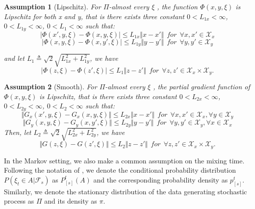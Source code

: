 \documentclass[twoside,11pt]{article}
\newtheorem{assumption}{Assumption}
\numberwithin{equation}{section}
\newcommand{\huaf}{\mathcal{F}}
\begin{document}
				
				
				
				\begin{assumption}[Lipschitz]\label{assumptionlipschitz}
					For $ \Pi $-almost every $ \xi $ , the function $ \Phi(x,y,\xi) $ is Lipschitz for both x and y, that is there exists three constant $0 < L_{1x} <\infty $,$ 0 <  L_{1y}  <\infty $, $ 0 <  L_{1}  <\infty $ such that:
					$$ |\Phi(x',y,\xi) - \Phi(x,y,\xi)| \le L_{1x } \Vert x-x' \Vert~~ for ~~\forall x,x'\in \mathcal{X}_x$$
					$$ |\Phi(x,y,\xi) - \Phi(x,y',\xi)| \le L_{1y } \Vert y-y' \Vert~~ for ~~\forall y,y'\in \mathcal{X}_y$$
					
					and let $ L_{1  } \triangleq \sqrt{2}  \sqrt{L_{1x } ^2 + L_{1y }^2}$, we have 
					$$ |\Phi(z,\xi) - \Phi(z',\xi)| \le  L_1 \Vert z-z' \Vert~~ for ~~\forall z,z'\in \mathcal{X}_x \times \mathcal{X}_y.$$
					
				\end{assumption}
				
				
				
				\begin{assumption}[Smooth]\label{assumptionsmooth}
					For $ \Pi $-almost every $ \xi $ , the partial gradient function  of $ \Phi(x,y,\xi) $ is Lipschitz,  that is there exists three constant $0 < L_{2x} <\infty $,$ 0 <  L_{2y}  <\infty $, $ 0 <  L_{2}  <\infty $ such that:
					$$ \Vert G_x(x',y,\xi) - G_x(x,y,\xi)\Vert \le L_{2x } \Vert x-x' \Vert~~ for ~~\forall x,x'\in \mathcal{X}_x,\forall y \in \mathcal{X}_y$$
					$$ \Vert G_y(x,y,\xi) - G_y(x,y',\xi)\Vert \le L_{2y } \Vert y-y' \Vert~~ for ~~\forall y,y'\in \mathcal{X}_y,\forall x \in \mathcal{X}_x$$
					Then, let $  L_{2 } \triangleq  \sqrt{2}\sqrt{L_{2x }^2+L_{2y }^2}$, we have
					$$ \Vert G (z,\xi) - G (z',\xi)\Vert \le  L_{2} \Vert z-z' \Vert~~ for ~~\forall z,z'\in \mathcal{X}_x \times \mathcal{X}_y.$$
				\end{assumption}
				

	
	In the Markov setting, we also make a common assumption on the mixing time.		
	Following the notation of \cite{duchi2012ergodic}, we denote the conditional probability distribution  $ P(\xi_t \in A | \huaf_s) $ as $ P_{[s]}^t(A) $ and the corresponding probability density as $ p_{[s]}^t $. Similarly, we denote the stationary distribution of the data generating stochastic process as $ \Pi $ and its density  as $ \pi  $.
	
\end{document}
